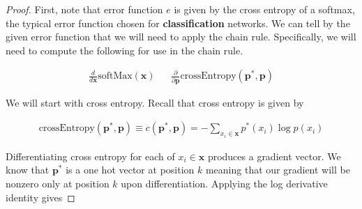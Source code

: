 \documentclass[11pt]{article}
\newcommand{\pd}{\partial}
\newcommand{\bs}{\boldsymbol}
\begin{document}
\begin{proof}
	First, note that error function $e$ is given by the cross entropy of a
	softmax, the typical error function chosen for \textbf{classification}
	networks. We can tell by the given error function that we will need to
	apply the chain rule.
	Specifically, we will need to compute the following for use in the chain
	rule.

	\begin{align}
		\frac{d}{d \bs{x}} \text{softMax}(\bs{x})
		&&
		\frac{\pd}{\pd \bs{p}} \text{crossEntropy}(\bs{p}^*, \bs{p})
	\end{align}

	We will start with cross entropy. Recall that cross entropy is given by

	\begin{align}
		\text{crossEntropy}(\boldsymbol{p}^*, \boldsymbol{p})
		\equiv
		c(\boldsymbol{p}^*, \boldsymbol{p})
		=
		-\sum_{x_i\in\boldsymbol{x}} p^*(x_i) \log p(x_i)
	\end{align}

	Differentiating cross entropy for each of $x_i \in \bs{x}$ produces a
	gradient vector. We know that $\bs{p}^*$ is a one hot vector at position
	$k$ meaning that our gradient will be nonzero only at position $k$ upon
	differentiation. Applying the log derivative identity gives


\end{proof}
\end{document}
